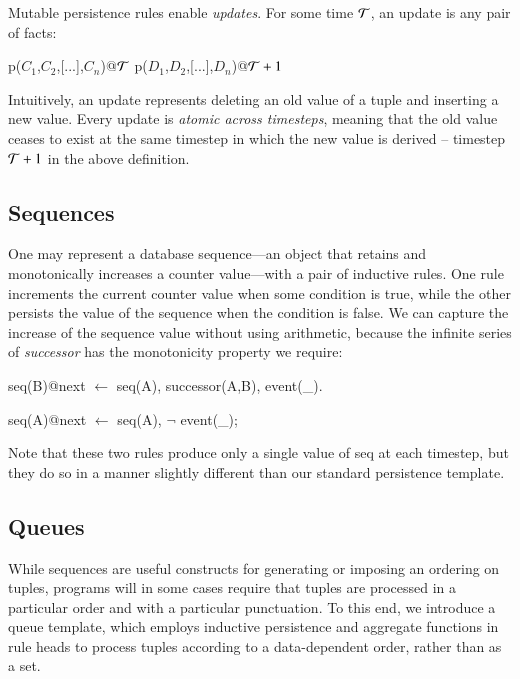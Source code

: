 Mutable persistence rules enable {\em updates}.  For some time $\Tau$, an
update is any pair of facts:

\begin{Dedalus}
p\nega(\(C_1\),\(C_2\),[...],\(C_n\))@\(\Tau\) 
p\pos(\(D_1\),\(D_2\),[...],\(D_n\))@\(\Tau+1\)
\end{Dedalus}

Intuitively, an update represents deleting an old value of a tuple and
inserting a new value.  Every update is {\em atomic across timesteps}, meaning
that the old value ceases to exist at the same timestep in which the new value
is derived -- timestep $\Tau+1$ in the above definition.

\subsection{Sequences}
One may represent a database sequence---an object that retains and monotonically increases a counter value---with a pair of inductive rules.  One rule increments the current counter value when some condition is 
true, while the other persists the value of the sequence when the condition is false.  We can capture the increase
of the sequence value without using arithmetic, because the infinite series of \emph{successor} has the monotonicity
property we require:

\begin{Dedalus}
seq(B)@next \(\leftarrow\) seq(A), successor(A,B), event(_).
  
seq(A)@next \(\leftarrow\) seq(A), \(\lnot\) event(_);
\end{Dedalus}

Note that these two rules produce only a single value of seq at each timestep, but they do so in a manner slightly different than our standard persistence template.


\subsection{Queues}



While sequences are useful constructs for generating or imposing an ordering on tuples, programs will in some cases require that tuples
are processed in a particular order and with a particular punctuation.   To this end, we introduce a queue template, which employs 
inductive persistence and aggregate functions in rule heads to process tuples according to a data-dependent order, rather than as a set.


